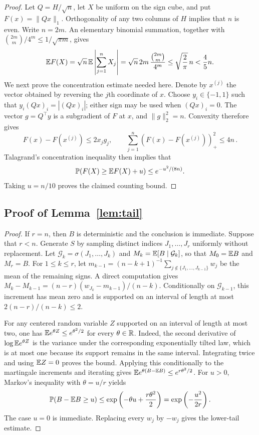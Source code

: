 \documentclass[11pt,reqno]{amsart}
\begin{document}
\begin{proof}
Let $Q=H/\sqrt n$, let $X$ be uniform on the sign cube, and put
$F(x)=\|Qx\|_1$. Orthogonality of any two columns of $H$ implies
that $n$ is even. Write $n=2m$. An elementary binomial summation,
together with $\binom{2m}{m}/4^m\le1/\sqrt{\pi m}$, gives
\[
\begin{aligned}
    {\mathbb{E}} F(X)
    =\sqrt n\,{\mathbb{E}}\left|\sum_{j=1}^n X_j\right|
     =\sqrt n\,2m\,\frac{\binom{2m}{m}}{4^m} \le\sqrt{\frac2\pi}\,n<\frac45n.
\end{aligned}
\]
We next prove the concentration estimate needed here. Denote by $x^{(j)}$ the vector obtained by reversing the $j$th coordinate of $x$. Choose $y_i\in\{-1,1\}$ such that $y_i(Qx)_i=|(Qx)_i|$; either sign may be used when $(Qx)_i=0$. The vector $g=Q^{\top}y$ is a subgradient of $F$ at $x$, and $\|g\|_2^2=n$. Convexity therefore gives
\[
    F(x)-F(x^{(j)})\le 2x_jg_j, \qquad \sum_{j=1}^n (F(x)-F(x^{(j)}))_+^2\le4n \,.
\]
Talagrand's concentration inequality then implies that
\[
 {\mathbb{P}}(F(X)\ge{\mathbb{E}} F(X)+u)\le e^{-u^2/(8n)}.
\]
Taking $u=n/10$ proves the claimed counting bound.
\end{proof}

\subsection{Proof of Lemma~\ref{lem:tail}}

\begin{proof}
If $r=n$, then $B$ is deterministic and the conclusion is immediate.
Suppose that $r<n$. Generate $S$ by sampling distinct indices
$J_1,\ldots,J_r$ uniformly without replacement. Let
$\mathcal G_k=\sigma(J_1,\ldots,J_k)$ and
$M_k={\mathbb{E}}[B\mid\mathcal G_k]$, so that $M_0={\mathbb{E}} B$ and $M_r=B$.
For $1\le k\le r$, let
$m_{k-1}=(n-k+1)^{-1}\sum_{j\notin\{J_1,\ldots,J_{k-1}\}}w_j$
be the mean of the remaining signs. A direct computation gives
$M_k-M_{k-1}=(n-r)(w_{J_k}-m_{k-1})/(n-k)$.
Conditionally on $\mathcal G_{k-1}$, this increment has mean zero
and is supported on an interval of length at most
$2(n-r)/(n-k)\le2$.

For any centered random variable $Z$ supported on an interval of
length at most two, one has ${\mathbb{E}} e^{\theta Z}\le e^{\theta^2/2}$
for every $\theta\in{\mathbb{R}}$. Indeed, the second derivative of
$\log{\mathbb{E}} e^{\theta Z}$ is the variance under the corresponding
exponentially tilted law, which is at most one because its support
remains in the same interval. Integrating twice and using
${\mathbb{E}} Z=0$ proves the bound. Applying this conditionally to the
martingale increments and iterating gives
${\mathbb{E}} e^{\theta(B-{\mathbb{E}} B)}\le e^{r\theta^2/2}$.
For $u>0$, Markov's inequality with $\theta=u/r$ yields
\[
    {\mathbb{P}}(B-{\mathbb{E}} B\ge u)
    \le\exp\left(-\theta u+\frac{r\theta^2}{2}\right)
    =\exp\left(-\frac{u^2}{2r}\right).
\]
The case $u=0$ is immediate. Replacing every $w_j$ by $-w_j$
gives the lower-tail estimate.
\end{proof}
\end{document}
